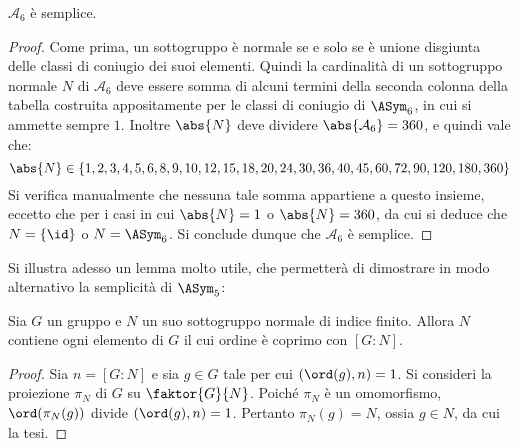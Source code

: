 \documentclass[11pt]{scrartcl}
\begin{document}
	\begin{proposition}
		\label{prop:a_6}
		$\mathcal{A}_6$ è semplice.
	\end{proposition}
	
	\begin{proof}
		Come prima, un sottogruppo è normale se e solo se è unione disgiunta
		delle classi di coniugio dei suoi elementi. Quindi la cardinalità
		di un sottogruppo normale $N$ di $\mathcal{A}_6$ deve essere somma di alcuni 
		termini della seconda colonna della tabella costruita appositamente
		per le classi di coniugio di $\ASym_6$,
		in cui si ammette sempre $1$. Inoltre $\abs{N}$ deve dividere
		$\abs{\mathcal{A}_6} = 360$, e quindi vale che:
		\[ \abs{N} \in \{1, 2, 3, 4, 5, 6, 8, 9, 10, 12, 15, 18, 20, 24, 30, 36, 40, 45, 60, 72, 90, 120, 180, 360\} \]
		Si verifica manualmente che nessuna tale somma appartiene a questo insieme,
		eccetto che per i casi in cui $\abs{N} = 1$ o $\abs{N} = 360$, da cui
		si deduce che $N = \{\id\}$ o $N = \ASym_6$.
		Si conclude dunque che $\mathcal{A}_6$ è semplice.
	\end{proof}
	
	Si illustra adesso un lemma molto utile, che permetterà di dimostrare in modo
	alternativo la semplicità di $\ASym_5$:
	
	\begin{lemma}
		\label{lemma1.62}
		Sia $G$ un gruppo e $N$ un suo sottogruppo normale di 
		indice finito. Allora $N$ contiene ogni elemento di $G$ il cui ordine è coprimo
		con $[G : N]$.
	\end{lemma}
	
	\begin{proof}
		Sia $n = [G : N]$ e
		sia $g \in G$ tale per cui $(\ord(g), n) = 1$. Si consideri la proiezione
		$\pi_N$ di $G$ su $\faktor{G}{N}$.
		Poiché $\pi_N$ è un omomorfismo, $\ord(\pi_N(g))$ divide $(\ord(g), n) = 1$.
		Pertanto $\pi_N(g) = N$, ossia $g \in N$, da cui la tesi.
	\end{proof}
	
\end{document}

